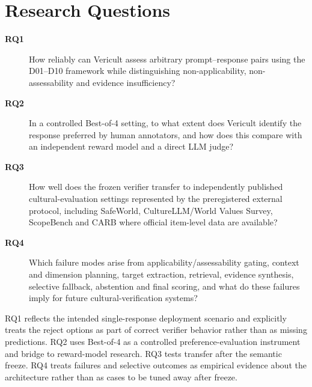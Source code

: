\section{Research Questions}
\begin{description}
    \item[\textbf{RQ1}] How reliably can Vericult assess arbitrary prompt--response pairs using the D01--D10 framework while distinguishing non-applicability, non-assessability and evidence insufficiency?
    \item[\textbf{RQ2}] In a controlled Best-of-4 setting, to what extent does Vericult identify the response preferred by human annotators, and how does this compare with an independent reward model and a direct LLM judge?
    \item[\textbf{RQ3}] How well does the frozen verifier transfer to independently published cultural-evaluation settings represented by the preregistered external protocol, including SafeWorld, CultureLLM/World Values Survey, ScopeBench and CARB where official item-level data are available?
    \item[\textbf{RQ4}] Which failure modes arise from applicability/assessability gating, context and dimension planning, target extraction, retrieval, evidence synthesis, selective fallback, abstention and final scoring, and what do these failures imply for future cultural-verification systems?
\end{description}

RQ1 reflects the intended single-response deployment scenario and explicitly treats the reject options as part of correct verifier behavior rather than as missing predictions. RQ2 uses Best-of-4 as a controlled preference-evaluation instrument and bridge to reward-model research. RQ3 tests transfer after the semantic freeze. RQ4 treats failures and selective outcomes as empirical evidence about the architecture rather than as cases to be tuned away after freeze.

